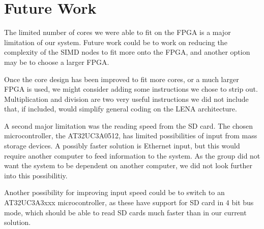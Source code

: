 \section{Future Work}
The limited number of cores we were able to fit on the FPGA is a major limitation
of our system. Future work could be to work on reducing the complexity of the
SIMD nodes to fit more onto the FPGA, and another option may be to choose a larger
FPGA.

Once the core design has been improved to fit more cores, or a much larger FPGA is
used, we might consider adding some instructions we chose to strip out. Multiplication
and division are two very useful instructions we did not include that, if included, would simplify
general coding on the LENA architecture.

A second major limitation was the reading speed from the SD card.
The chosen microcontroller, the AT32UC3A0512, has limited possibilities of input
from mass storage devices. A possibly faster solution is Ethernet input, but this
would require another computer to feed information to the system. As the group did not want the system to 
be dependent on another computer, we did not look further into this possibilitiy.

Another possibility for improving input speed could be to switch to an AT32UC3A3xxx
microcontroller, as these have support for SD card in 4 bit bus mode, which should be
able to read SD cards much faster than in our current solution.
